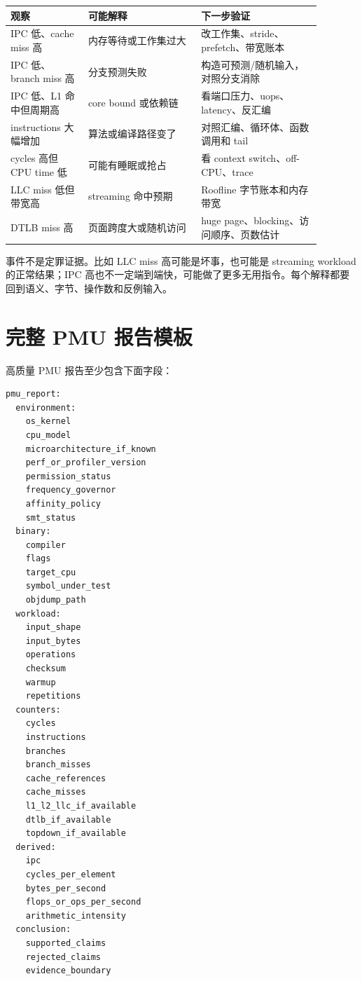 \begin{center}
\small
\begin{tabular}{p{0.22\linewidth}p{0.32\linewidth}p{0.34\linewidth}}
\toprule
观察 & 可能解释 & 下一步验证 \\
\midrule
IPC 低、cache miss 高 & 内存等待或工作集过大 & 改工作集、stride、prefetch、带宽账本 \\
IPC 低、branch miss 高 & 分支预测失败 & 构造可预测/随机输入，对照分支消除 \\
IPC 低、L1 命中但周期高 & core bound 或依赖链 & 看端口压力、uops、latency、反汇编 \\
instructions 大幅增加 & 算法或编译路径变了 & 对照汇编、循环体、函数调用和 tail \\
cycles 高但 CPU time 低 & 可能有睡眠或抢占 & 看 context switch、off-CPU、trace \\
LLC miss 低但带宽高 & streaming 命中预期 & Roofline 字节账本和内存带宽 \\
DTLB miss 高 & 页面跨度大或随机访问 & huge page、blocking、访问顺序、页数估计 \\
\bottomrule
\end{tabular}
\end{center}

事件不是定罪证据。比如 LLC miss 高可能是坏事，也可能是 streaming workload 的正常结果；IPC 高也不一定端到端快，可能做了更多无用指令。每个解释都要回到语义、字节、操作数和反例输入。

\section{完整 PMU 报告模板}

高质量 PMU 报告至少包含下面字段：

\begin{lstlisting}[numbers=none,caption={PMU/Top-Down 报告字段}]
pmu_report:
  environment:
    os_kernel
    cpu_model
    microarchitecture_if_known
    perf_or_profiler_version
    permission_status
    frequency_governor
    affinity_policy
    smt_status
  binary:
    compiler
    flags
    target_cpu
    symbol_under_test
    objdump_path
  workload:
    input_shape
    input_bytes
    operations
    checksum
    warmup
    repetitions
  counters:
    cycles
    instructions
    branches
    branch_misses
    cache_references
    cache_misses
    l1_l2_llc_if_available
    dtlb_if_available
    topdown_if_available
  derived:
    ipc
    cycles_per_element
    bytes_per_second
    flops_or_ops_per_second
    arithmetic_intensity
  conclusion:
    supported_claims
    rejected_claims
    evidence_boundary
\end{lstlisting}

